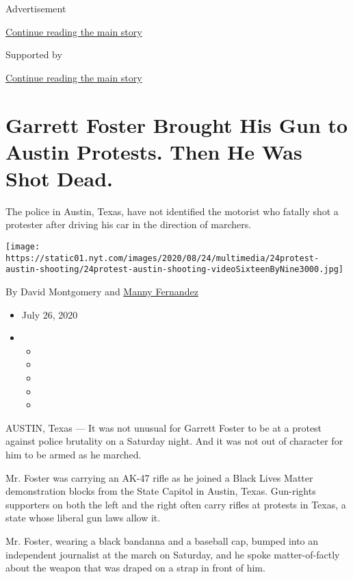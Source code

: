 Advertisement

\protect\hyperlink{after-top}{Continue reading the main story}

Supported by

\protect\hyperlink{after-sponsor}{Continue reading the main story}

\hypertarget{garrett-foster-brought-his-gun-to-austin-protests-then-he-was-shot-dead}{%
\section{Garrett Foster Brought His Gun to Austin Protests. Then He Was
Shot
Dead.}\label{garrett-foster-brought-his-gun-to-austin-protests-then-he-was-shot-dead}}

The police in Austin, Texas, have not identified the motorist who
fatally shot a protester after driving his car in the direction of
marchers.

\texttt{[image: https://static01.nyt.com/images/2020/08/24/multimedia/24protest-austin-shooting/24protest-austin-shooting-videoSixteenByNine3000.jpg]}

By David Montgomery and
\href{https://www.nytimes.com/by/manny-fernandez}{Manny Fernandez}

\begin{itemize}
\item
  July 26, 2020
\item
  \begin{itemize}
  \item
  \item
  \item
  \item
  \item
  \end{itemize}
\end{itemize}

AUSTIN, Texas --- It was not unusual for Garrett Foster to be at a
protest against police brutality on a Saturday night. And it was not out
of character for him to be armed as he marched.

Mr. Foster was carrying an AK-47 rifle as he joined a Black Lives Matter
demonstration blocks from the State Capitol in Austin, Texas. Gun-rights
supporters on both the left and the right often carry rifles at protests
in Texas, a state whose liberal gun laws allow it.

Mr. Foster, wearing a black bandanna and a baseball cap, bumped into an
independent journalist at the march on Saturday, and he spoke
matter-of-factly about the weapon that was draped on a strap in front of
him.

